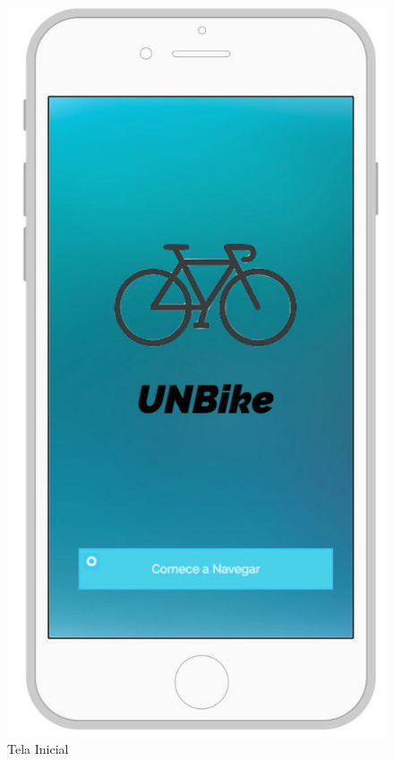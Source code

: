 \begin{figure}[!htb]
	\centering
	\includegraphics[scale=0.50]{tela_inicial.jpg}
	\caption{Tela Inicial}
	\label{img:telainicial}
\end{figure}

\newpage

